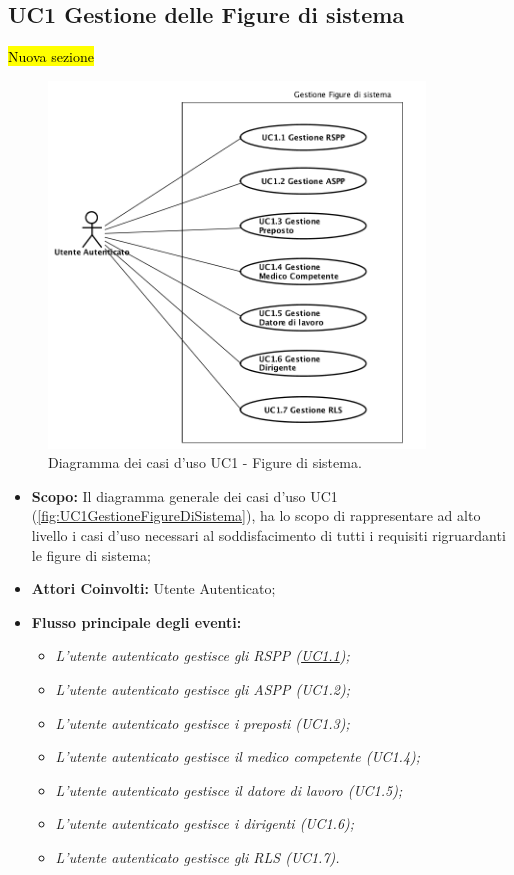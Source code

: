 	\subsection{UC1 Gestione delle Figure di sistema}
	\label{section:UC1}
	\hl{Nuova sezione}
	\begin{figure}[H]
		\begin{center}
			\includegraphics[width=10cm]{Pics/UC1GestioneFigureDiSistema.png}
			\caption{
				Diagramma dei casi d'uso UC1 - Figure di sistema.}
			\label{fig:UC1GestioneFigureDiSistema}
		\end{center}
	\end{figure}
	\begin{itemize}
		\item \textbf{Scopo:} Il diagramma generale dei casi d'uso UC1 (\autoref{fig:UC1GestioneFigureDiSistema}), ha lo scopo di rappresentare ad alto livello i casi d'uso necessari al soddisfacimento di tutti i requisiti rigruardanti le figure di sistema;
		\item \textbf{Attori Coinvolti:} Utente Autenticato;
		\item \textbf{Flusso principale degli eventi:} 
		\begin{itemize}
			\item \textit{L'utente autenticato gestisce gli RSPP (\hyperref[section:UC1_1]{UC1.1});}
			\item \textit{L'utente autenticato gestisce gli ASPP (UC1.2);}
			\item \textit{L'utente autenticato gestisce i preposti (UC1.3);}
			\item \textit{L'utente autenticato gestisce il medico competente (UC1.4);}
			\item \textit{L'utente autenticato gestisce il datore di lavoro (UC1.5);}
			\item \textit{L'utente autenticato gestisce i dirigenti (UC1.6);}
			\item \textit{L'utente autenticato gestisce gli RLS (UC1.7).}
		\end{itemize}
	\end{itemize}
		
